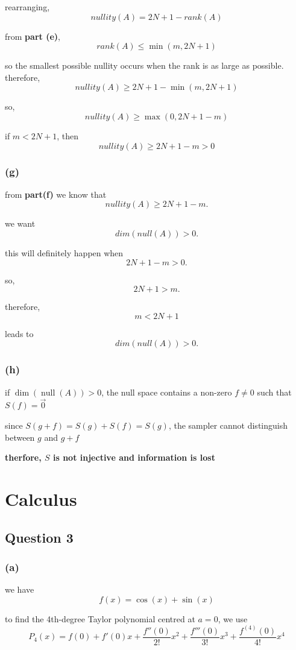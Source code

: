 \documentclass{article}
\begin{document}
rearranging,
\[
nullity(A)=2N+1-rank(A)
\]

from \textbf{part (e)},
\[
rank(A)\leq\min(m,2N+1)
\]

so the smallest possible nullity occurs when the rank is as large as possible.
therefore,
\[
nullity(A)\geq 2N+1-\min(m,2N+1)
\]

so,
\[
\boxed{nullity(A)\geq\max(0,2N+1-m)}
\]

if $m<2N+1$, then
\[
\boxed{nullity(A)\geq2N+1-m>0}
\]

\subsubsection*{(g)}
from \textbf{part(f)} we know that
\[
nullity(A)\geq2N+1-m.
\]

we want
\[
dim(null(A))>0.
\]

this will definitely happen when
\[
2N+1-m>0.
\]

so,
\[
2N+1>m.
\]

therefore,
\[
\boxed{m<2N+1}
\]

leads to
\[
\boxed{dim(null(A))>0}.
\]

\subsubsection*{(h)}

if $\dim(\operatorname{null}(A)) > 0$, the null space contains a non-zero $f \neq 0$ such that $S(f) = \vec{0}$

since $S(g+f) = S(g) + S(f) = S(g)$, the sampler cannot distinguish between $g$ and $g+f$

\textbf{therfore, $S$ is not injective and information is lost}

\section{Calculus}

\subsection{Question 3}

\subsubsection*{(a)}
we have
\[
f(x)=\cos(x)+\sin(x)
\]

to find the 4th-degree Taylor polynomial centred at $a=0$, we use
\[
P_4(x)=f(0)+f'(0)x+\frac{f''(0)}{2!}x^2 + \frac{f'''(0)}{3!}x^3+\frac{f^{(4)}(0)}{4!}x^4
\]
\end{document}
